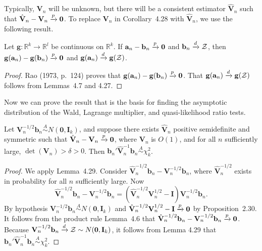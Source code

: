 Typically, $\mathbf{V}_n$ will be unknown, but there will be a consistent estimator
$\hat{\mathbf{V}}_n$ such that $\hat{\mathbf{V}}_n - \mathbf{V}_n \xrightarrow{p} \mathbf{0}$. To replace $\mathbf{V}_n$ in Corollary~4.28 with $\hat{\mathbf{V}}_n$,
we use the following result.

\begin{lemma}\label{lem:4.29}
Let $\mathbf{g} : \mathbb{R}^k \to \mathbb{R}^l$ be continuous on $\mathbb{R}^k$. If $\mathbf{a}_n - \mathbf{b}_n \xrightarrow{p} \mathbf{0}$ and $\mathbf{b}_n \xrightarrow{d} \mathcal{Z}$, then $\mathbf{g}(\mathbf{a}_n) - \mathbf{g}(\mathbf{b}_n) \xrightarrow{p} \mathbf{0}$ and $\mathbf{g}(\mathbf{a}_n) \xrightarrow{d} \mathbf{g}(\mathcal{Z})$.
\end{lemma}

\begin{proof}
Rao (1973, p.~124) proves that $\mathbf{g}(\mathbf{a}_n) - \mathbf{g}(\mathbf{b}_n) \xrightarrow{p} \mathbf{0}$. That $\mathbf{g}(\mathbf{a}_n) \xrightarrow{d} \mathbf{g}(\mathcal{Z})$ follows from Lemmas~4.7 and 4.27.
\end{proof}

Now we can prove the result that is the basis for finding the asymptotic
distribution of the Wald, Lagrange multiplier, and quasi-likelihood ratio
tests.

\begin{theorem}\label{thm:4.30}
Let $\mathbf{V}_n^{-1/2}\mathbf{b}_n \overset{A}{\sim} N(\mathbf{0}, \mathbf{I}_k)$, and suppose there exists $\hat{\mathbf{V}}_n$ positive semidefinite and symmetric such that $\hat{\mathbf{V}}_n - \mathbf{V}_n \xrightarrow{p} \mathbf{0}$, where $\mathbf{V}_n$ is $O(1)$, and for all $n$ sufficiently large, $\det(\mathbf{V}_n) > \delta > 0$. Then $\mathbf{b}_n'\hat{\mathbf{V}}_n^{-1}\mathbf{b}_n \overset{A}{\sim} \chi_k^2$.
\end{theorem}

\begin{proof}
We apply Lemma~4.29. Consider $\hat{\mathbf{V}}_n^{-1/2}\mathbf{b}_n - \mathbf{V}_n^{-1/2}\mathbf{b}_n$, where $\hat{\mathbf{V}}_n^{-1/2}$
exists in probability for all $n$ sufficiently large. Now
\[
\hat{\mathbf{V}}_n^{-1/2}\mathbf{b}_n - \mathbf{V}_n^{-1/2}\mathbf{b}_n = (\hat{\mathbf{V}}_n^{-1/2}\mathbf{V}_n^{1/2} - \mathbf{I})\mathbf{V}_n^{-1/2}\mathbf{b}_n.
\]
By hypothesis $\mathbf{V}_n^{-1/2}\mathbf{b}_n \overset{A}{\sim} N(\mathbf{0}, \mathbf{I}_k)$ and $\hat{\mathbf{V}}_n^{-1/2}\mathbf{V}_n^{1/2} - \mathbf{I} \xrightarrow{p} \mathbf{0}$ by Proposition~2.30. It follows from the product rule Lemma~4.6 that $\hat{\mathbf{V}}_n^{-1/2}\mathbf{b}_n -
\mathbf{V}_n^{-1/2}\mathbf{b}_n \xrightarrow{p} \mathbf{0}$. Because $\mathbf{V}_n^{-1/2}\mathbf{b}_n \xrightarrow{d} \mathcal{Z} \sim N(\mathbf{0}, \mathbf{I}_k)$, it follows from Lemma
4.29 that $\mathbf{b}_n'\hat{\mathbf{V}}_n^{-1}\mathbf{b}_n \overset{A}{\sim} \chi_k^2$.
\end{proof}

